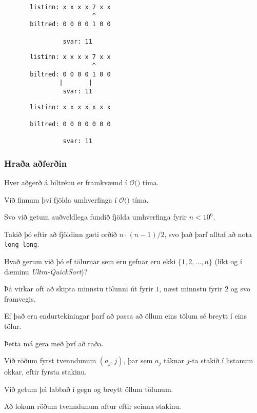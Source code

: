 { \begin{verbatim}
       listinn: x x x x 7 x x
                        ^
       biltred: 0 0 0 0 1 0 0

                svar: 11
\end{verbatim}}
{ \begin{verbatim}
       listinn: x x x x 7 x x
                        ^
       biltred: 0 0 0 0 1 0 0
               |       |
                svar: 11
\end{verbatim}}
{ \begin{verbatim}
       listinn: x x x x x x x

       biltred: 0 0 0 0 0 0 0

                svar: 11
\end{verbatim}}
{
	\frametitle{Hraða aðferðin}
}

{
}

{
	{
		\item<1-> Hver aðgerð á biltrénu er framkvæmd í $\mathcal{O}($$)$ tíma.
		\item<3-> Við finnum því fjölda umhverfinga í $\mathcal{O}($$)$ tíma.
		\item<5-> Svo við getum auðveldlega fundið fjölda umhverfinga fyrir $n < 10^6$.
		\item<6-> Takið þó eftir að fjöldinn gæti orðið $n \cdot (n - 1)/2$, svo það þarf alltaf að nota \texttt{long long}.
	}
}

{
	{
		\item<1-> Hvað gerum við þó ef tölurnar sem eru gefnar eru ekki $\{1, 2, ..., n\}$ (líkt og í dæminu \emph{Ultra-QuickSort})?
		\item<2-> Þá virkar oft að skipta minnstu tölunni út fyrir $1$, næst minnstu fyrir $2$ og svo framvegis.
		\item<3-> Ef það eru endurtekiningar þarf að passa að öllum eins tölum sé breytt í eins tölur.
		\item<4-> Þetta má gera með því að raða.
		\item<5-> Við röðum fyrst tvenndunum $(a_j, j)$, þar sem $a_j$ táknar $j$-ta stakið í listanum okkar, eftir fyrsta stakinu.
		\item<6-> Við getum þá labbað í gegn og breytt öllum tölunum.
		\item<7-> Að lokum röðum tvenndunum aftur eftir seinna stakinu.
	}
}

